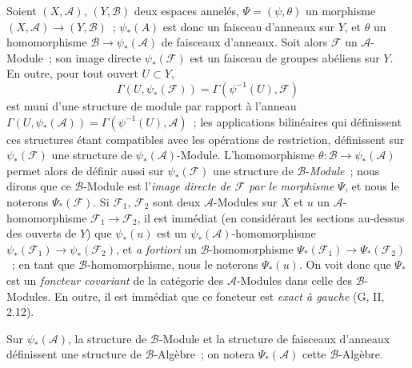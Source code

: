 \begin{env}[4.2.1]
\label{0.4.2.1-fr}
Soient $(X,\mathcal{A})$, $(Y,\mathcal{B})$ deux espaces annelés,
$\Psi=(\psi,\theta)$ un morphisme
$(X,\mathcal{A})\to(Y,\mathcal{B})$~; $\psi_*(A)$ est donc un
faisceau d'anneaux sur $Y$, et $\theta$ un homomorphisme
$\mathcal{B}\to\psi_*(\mathcal{A})$ de faisceaux d'anneaux. Soit alors
$\mathcal{F}$ un $\mathcal{A}$-Module~; son image directe
$\psi_*(\mathcal{F})$ est un faisceau de groupes abéliens sur $Y$. En outre,
pour tout ouvert $U\subset Y$,
\[
  \Gamma(U,\psi_*(\mathcal{F}))
  =\Gamma(\psi^{-1}(U),\mathcal{F})
\]
est muni d'une structure de module par rapport à l'anneau
$\Gamma(U,\psi_*(\mathcal{A}))=\Gamma(\psi^{-1}(U),\mathcal{A})$~; les
applications bilinéaires qui définissent ces structures étant compatibles
avec les opérations de restriction, définissent sur $\psi_*(\mathcal{F})$ une
structure de $\psi_*(\mathcal{A})$-Module. L'homomorphisme
$\theta:\mathcal{B}\to\psi_*(\mathcal{A})$ permet alors de définir aussi sur
$\psi_*(\mathcal{F})$ une structure de $\mathcal{B}$-\emph{Module}~; nous dirons que
ce $\mathcal{B}$-Module est l'\emph{image directe de $\mathcal{F}$ par le
morphisme $\Psi$}, et nous le noterons $\Psi_*(\mathcal{F})$. Si
$\mathcal{F}_1$, $\mathcal{F}_2$ sont deux $\mathcal{A}$-Modules sur $X$ et
$u$ un $\mathcal{A}$-homomorphisme $\mathcal{F}_1\to\mathcal{F}_2$, il est
immédiat (en considérant les sections au-dessus des ouverts de $Y$) que
$\psi_*(u)$ est un $\psi_*(\mathcal{A})$-homomorphisme
$\psi_*(\mathcal{F}_1)\to\psi_*(\mathcal{F}_2)$, et \emph{a fortiori} un
$\mathcal{B}$-homomorphisme
$\Psi_*(\mathcal{F}_1)\to\Psi_*(\mathcal{F}_2)$~; en tant que
$\mathcal{B}$-homomorphisme, nous le noterons $\Psi_*(u)$. On voit donc que
$\Psi_*$ est un \emph{foncteur covariant} de la catégorie des
$\mathcal{A}$-Modules dans celle des $\mathcal{B}$-Modules. En outre, il est
immédiat que ce foncteur est \emph{exact à gauche} (G, II, 2.12).

Sur $\psi_*(\mathcal{A})$, la structure de $\mathcal{B}$-Module et la
structure de faisceaux d'anneaux définissent une structure de
$\mathcal{B}$-Algèbre~; on notera $\Psi_*(\mathcal{A})$ cette
$\mathcal{B}$-Algèbre.
\end{env}

